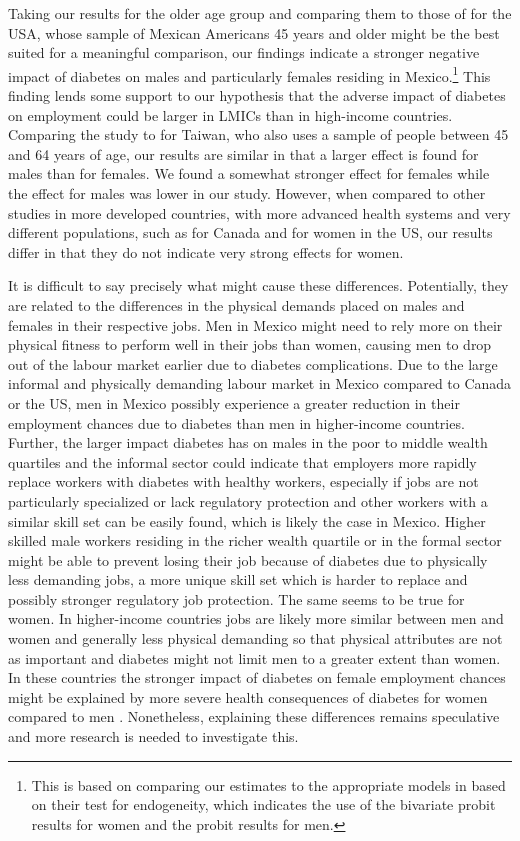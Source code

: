 Taking our results for the older age group and comparing
them to those of \textcite{Brown2005} for the USA, whose sample
of Mexican Americans 45 years and older might be the best suited for
a meaningful comparison, our findings indicate a stronger negative
impact of diabetes on males and particularly females residing in Mexico.\footnote{This is based on comparing our estimates to the appropriate
models in \textcite{Brown2005} based on their test for endogeneity,
which indicates the use of the bivariate probit results for women
and the probit results for men. } This finding lends some support to our hypothesis that the adverse
impact of diabetes on employment could be larger in \acp{LMIC} than
in high-income countries. Comparing the study to \textcite{Lin2011b}
for Taiwan, who also uses a sample of people between 45 and 64 years
of age, our results are similar in that a larger effect is found for
males than for females. We found a somewhat stronger effect for females
while the effect for males was lower in our study. However, when compared
to other studies in more developed countries, with more advanced health
systems and very different populations, such as \textcite{Latif2009}
for Canada and \textcite{Minor2011} for women in the US, our results
differ in that they do not indicate very strong effects for women. 

It is difficult to say precisely what might cause these
differences. Potentially, they are related to the differences in the
physical demands placed on males and females in their respective jobs.
Men in Mexico might need to rely more on their physical fitness to
perform well in their jobs than women, causing men to drop out of
the labour market earlier due to diabetes complications. Due to the
large informal and physically demanding labour market in Mexico compared
to Canada or the US, men in Mexico possibly experience a greater reduction
in their employment chances due to diabetes than men in higher-income
countries. Further, the larger impact diabetes has on males in the
poor to middle wealth quartiles and the informal sector could indicate
that employers more rapidly replace workers with diabetes with healthy
workers, especially if jobs are not particularly specialized or lack
regulatory protection and other workers with a similar skill set can
be easily found, which is likely the case in Mexico. Higher skilled
male workers residing in the richer wealth quartile or in the formal
sector might be able to prevent losing their job because of diabetes
due to physically less demanding jobs,  a more unique skill set which
is harder to replace and possibly stronger regulatory job protection.
The same seems to be true for women. In higher-income countries jobs
are likely more similar between men and women and generally less physical
demanding so that physical attributes are not as important and diabetes
might not limit men to a greater extent than women. In these countries
the stronger impact of diabetes on female employment chances might
be explained by more severe health consequences of diabetes for women
compared to men \parencite{Huxley2006}. Nonetheless, explaining these
differences remains speculative and more research is needed to investigate
this.

